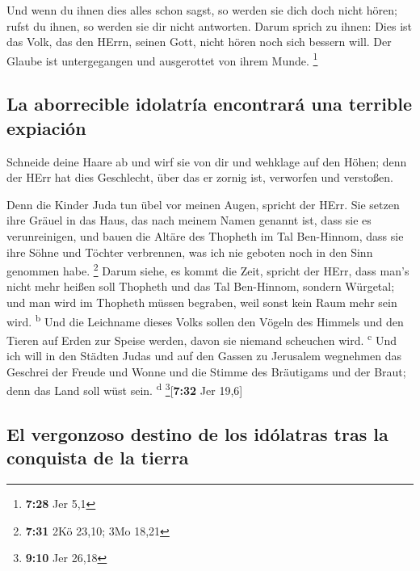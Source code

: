  Und wenn du ihnen dies alles schon sagst, so werden sie
dich doch nicht hören; rufst du ihnen, so werden sie dir nicht
antworten.  Darum sprich zu ihnen: Dies ist das Volk, das
den HErrn, seinen Gott, nicht hören noch sich bessern will. Der Glaube
ist untergegangen und ausgerottet von ihrem Munde. \footnote{\textbf{7:28}
  Jer 5,1}

\hypertarget{la-aborrecible-idolatruxeda-encontraruxe1-una-terrible-expiaciuxf3n}{%
\subsection{La aborrecible idolatría encontrará una terrible
expiación}\label{la-aborrecible-idolatruxeda-encontraruxe1-una-terrible-expiaciuxf3n}}

 Schneide deine Haare ab und wirf sie von dir und
wehklage auf den Höhen; denn der HErr hat dies Geschlecht, über das er
zornig ist, verworfen und verstoßen.

 Denn die Kinder Juda tun übel vor meinen Augen, spricht
der HErr. Sie setzen ihre Gräuel in das Haus, das nach meinem Namen
genannt ist, dass sie es verunreinigen,  und bauen die
Altäre des Thopheth im Tal Ben-Hinnom, dass sie ihre Söhne und Töchter
verbrennen, was ich nie geboten noch in den Sinn genommen habe.
\footnote{\textbf{7:31} 2Kö 23,10; 3Mo 18,21}  Darum
siehe, es kommt die Zeit, spricht der HErr, dass man's nicht mehr heißen
soll Thopheth und das Tal Ben-Hinnom, sondern Würgetal; und man wird im
Thopheth müssen begraben, weil sonst kein Raum mehr sein wird.
\textsuperscript{b}  Und die Leichname dieses Volks
sollen den Vögeln des Himmels und den Tieren auf Erden zur Speise
werden, davon sie niemand scheuchen wird. \textsuperscript{c}
 Und ich will in den Städten Judas und auf den Gassen zu
Jerusalem wegnehmen das Geschrei der Freude und Wonne und die Stimme des
Bräutigams und der Braut; denn das Land soll wüst sein.
\textsuperscript{d} \footnote{\textbf{9:10} Jer 26,18}{[}\textbf{7:32}
Jer 19,6{]}

\hypertarget{el-vergonzoso-destino-de-los-iduxf3latras-tras-la-conquista-de-la-tierra}{%
\subsection{El vergonzoso destino de los idólatras tras la conquista de
la
tierra}\label{el-vergonzoso-destino-de-los-iduxf3latras-tras-la-conquista-de-la-tierra}}

